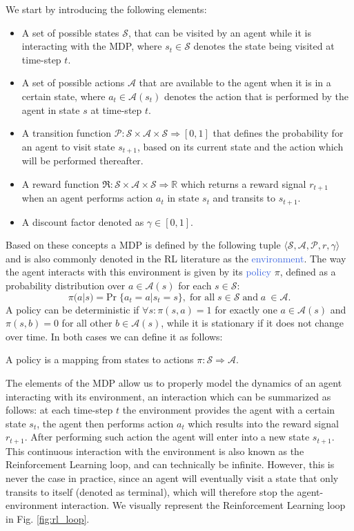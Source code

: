 We start by introducing the following elements:
\begin{itemize}
	\item A set of possible states $\mathcal{S}$, that can be visited by an agent while it is interacting with the MDP, where $s_t \in \mathcal{S}$ denotes the state being visited at time-step $t$.
	\item A set of possible actions $\mathcal{A}$ that are available to the agent when it is in a certain state, where $a_t \in \mathcal{A}(s_t)$ denotes the action that is performed by the agent in state $s$ at time-step $t$.
\item A transition function $\mathcal{P}:\mathcal{S}\times\mathcal{A}\times\mathcal{S}\Rightarrow [0,1]$ that defines the probability for an agent to visit state $s_{t+1}$, based on its current state and the action which will be performed thereafter.
\item A reward function $\Re:\mathcal{S}\times\mathcal{A}\times\mathcal{S}\Rightarrow \mathbb{R}$ which returns a reward signal $r_{t+1}$ when an agent performs action $a_t$ in state $s_t$ and transits to $s_{t+1}$.
\item A discount factor denoted as $\gamma \in [0,1]$.

\end{itemize}

Based on these concepts a MDP is defined by the following tuple $\langle\mathcal{S}, \mathcal{A}, \mathcal{P}, r, \gamma\rangle$ and is also commonly denoted in the RL literature as the \textcolor{RoyalBlue}{environment}. The way the agent interacts with this environment is given by its \textcolor{RoyalBlue}{policy} $\pi$, defined as a probability distribution over $a \in \mathcal{A}(s)$ for each $s \in \mathcal{S}$:
\begin{equation}
	\pi(a|s) = \text{Pr}\; \{a_t = a | s_t = s\}, \; \text{for all}\; s \in \mathcal{S}\; \text{and}\; a\ \in \mathcal{A}. 
\end{equation}
A policy can be deterministic if $\forall s:\pi(s,a) = 1$ for exactly one $a \in \mathcal{A}(s)$ and $\pi(s,b)=0$ for all other $b \in \mathcal{A}(s)$, while it is stationary if it does not change over time. In both cases 
we can define it as follows:
\begin{definition}
	A policy is a mapping from states to actions $\pi:\mathcal{S}\Rightarrow\mathcal{A}$. 
\end{definition}
The elements of the MDP allow us to properly model the dynamics of an agent interacting with its environment, an interaction which can be summarized as follows: at each time-step $t$ the environment provides the agent with a certain state $s_t$, the agent then performs action $a_t$ which results into the reward signal $r_{t+1}$. After performing such action the agent will enter into a new state $s_{t+1}$. This continuous interaction with the environment is also known as the Reinforcement Learning loop, and can technically be infinite. However, this is never the case in practice, since an agent will eventually visit a state that only transits to itself (denoted as terminal), which will therefore stop the agent-environment interaction. We visually represent the Reinforcement Learning loop in Fig. \ref{fig:rl_loop}.

